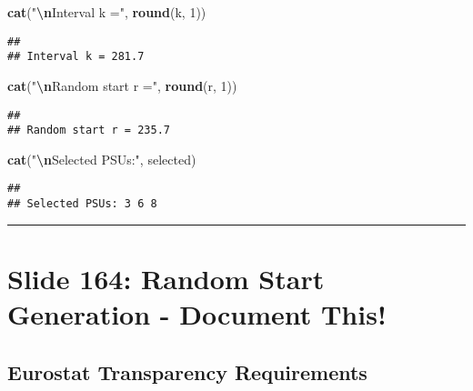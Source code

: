 \documentclass[
]{article}
\newenvironment{Shaded}{\begin{snugshade}}{\end{snugshade}}
\newcommand{\DecValTok}[1]{\textcolor[rgb]{0.00,0.00,0.81}{#1}}
\newcommand{\FunctionTok}[1]{\textcolor[rgb]{0.13,0.29,0.53}{\textbf{#1}}}
\newcommand{\NormalTok}[1]{#1}
\newcommand{\SpecialCharTok}[1]{\textcolor[rgb]{0.81,0.36,0.00}{\textbf{#1}}}
\newcommand{\StringTok}[1]{\textcolor[rgb]{0.31,0.60,0.02}{#1}}
\begin{document}
\begin{Shaded}
\begin{Highlighting}[]
\FunctionTok{cat}\NormalTok{(}\StringTok{"}\SpecialCharTok{\textbackslash{}n}\StringTok{Interval k ="}\NormalTok{, }\FunctionTok{round}\NormalTok{(k, }\DecValTok{1}\NormalTok{))}
\end{Highlighting}
\end{Shaded}

\begin{verbatim}
## 
## Interval k = 281.7
\end{verbatim}

\begin{Shaded}
\begin{Highlighting}[]
\FunctionTok{cat}\NormalTok{(}\StringTok{"}\SpecialCharTok{\textbackslash{}n}\StringTok{Random start r ="}\NormalTok{, }\FunctionTok{round}\NormalTok{(r, }\DecValTok{1}\NormalTok{))}
\end{Highlighting}
\end{Shaded}

\begin{verbatim}
## 
## Random start r = 235.7
\end{verbatim}

\begin{Shaded}
\begin{Highlighting}[]
\FunctionTok{cat}\NormalTok{(}\StringTok{"}\SpecialCharTok{\textbackslash{}n}\StringTok{Selected PSUs:"}\NormalTok{, selected)}
\end{Highlighting}
\end{Shaded}

\begin{verbatim}
## 
## Selected PSUs: 3 6 8
\end{verbatim}

\begin{center}\rule{0.5\linewidth}{0.5pt}\end{center}

\section{Slide 164: Random Start Generation - Document
This!}\label{slide-164-random-start-generation---document-this}

\subsection{Eurostat Transparency
Requirements}\label{eurostat-transparency-requirements}
\end{document}
